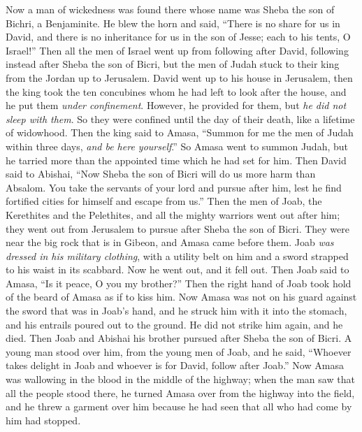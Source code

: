 \begin{biblechapter} %
 Now a man of wickedness was found there whose name was Sheba the son of Bichri, a Benjaminite. He blew the horn and said, “There is no share for us in David, and there is no inheritance for us in the son of Jesse; each to his tents, O Israel!”
\verse Then all the men of Israel went up from following after David, following instead after Sheba the son of Bicri, but the men of Judah stuck to their king from the Jordan up to Jerusalem.
\verse David went up to his house in Jerusalem, then the king took the ten concubines whom he had left to look after the house, and he put them \textit{under confinement}. However, he provided for them, but \textit{he did not sleep with them}. So they were confined until the day of their death, like a lifetime of widowhood.
 Then the king said to Amasa, “Summon for me the men of Judah within three days, \textit{and be here yourself}.”
\verse So Amasa went to summon Judah, but he tarried more than the appointed time which he had set for him.
\verse Then David said to Abishai, “Now Sheba the son of Bicri will do us more harm than Absalom. You take the servants of your lord and pursue after him, lest he find fortified cities for himself and escape from us.”
\verse Then the men of Joab, the Kerethites and the Pelethites, and all the mighty warriors went out after him; they went out from Jerusalem to pursue after Sheba the son of Bicri.
\verse They were near the big rock that is in Gibeon, and Amasa came before them. Joab \textit{was dressed in his military clothing}, with a utility belt on him and a sword strapped to his waist in its scabbard. Now he went out, and it fell out.
\verse Then Joab said to Amasa, “Is it peace, O you my brother?” Then the right hand of Joab took hold of the beard of Amasa as if to kiss him.
\verse Now Amasa was not on his guard against the sword that was in Joab’s hand, and he struck him with it into the stomach, and his entrails poured out to the ground. He did not strike him again, and he died. Then Joab and Abishai his brother pursued after Sheba the son of Bicri.
\verse A young man stood over him, from the young men of Joab, and he said, “Whoever takes delight in Joab and whoever is for David, follow after Joab.”
\verse Now Amasa was wallowing in the blood in the middle of the highway; when the man saw that all the people stood there, he turned Amasa over from the highway into the field, and he threw a garment over him because he had seen that all who had come by him had stopped.

\end{biblechapter}
